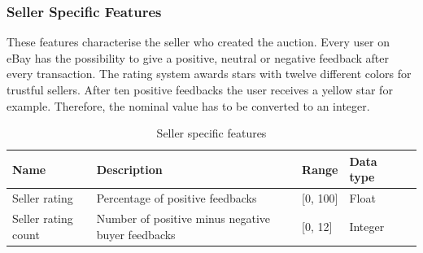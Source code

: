 \subsubsection{Seller Specific Features}
These features characterise the seller who created the auction. Every user on eBay has the possibility to give a positive, neutral or negative feedback after every transaction. The rating system awards stars with twelve different colors for trustful sellers. After ten positive feedbacks the user receives a yellow star for example. Therefore, the nominal value has to be converted to an integer.
\begin{table}[h!]
	\begin{center}
	\begin{tabular}{| p{2.6cm} | p{2.6cm} | p{2.6cm} | p{2.6cm} | p{2.6cm} |}
		\hline
		Name & Description &  Range & Data type \\
		\hline
		Seller rating & Percentage of positive feedbacks & [0, 100] & Float \\
		\hline
		Seller rating count & Number of positive minus negative buyer feedbacks & [0, 12] & Integer \\
		\hline
	\end{tabular}
	\end{center}
	\caption{Seller specific features}
\end{table}
